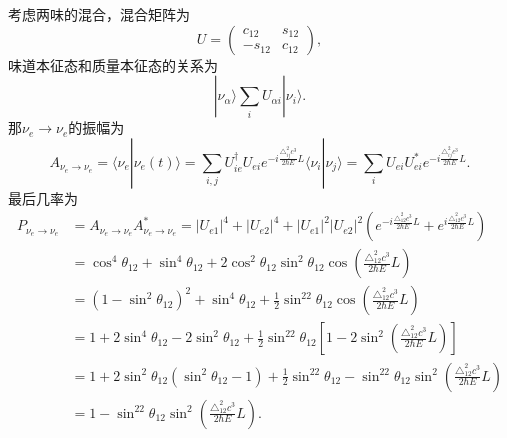 			\begin{GCBox}[title = 二味混合]
				考虑两味的混合，混合矩阵为
					\begin{equation}
						U
						=\left(\begin{matrix}
							c_{12} & s_{12}\\
							-s_{12} & c_{12}
						\end{matrix}\right),
					\end{equation}
				味道本征态和质量本征态的关系为
					\begin{equation}
						|\nu_\alpha\rangle
						\sum_i U_{\alpha i}|\nu_i\rangle.
					\end{equation}
				那$\nu_e\rightarrow\nu_e$的振幅为
					\begin{equation}
						A_{\nu_e \rightarrow \nu_e}
						= \langle \nu_e|\nu_e(t)\rangle
						= \sum_{i,j} U^\dag_{ie}U_{ei}e^{-i\frac{\triangle^2_{ij}c^3}{2\hbar E}L}\langle \nu_i|\nu_j\rangle
						= \sum_i U_{ei}U^*_{ei}e^{-i\frac{\triangle_{ij}^2c^3}{2\hbar E}L}.
					\end{equation}
				最后几率为
					\begin{equation}
						\begin{aligned}
							P_{\nu_e \rightarrow \nu_e}
							&= A_{\nu_e \rightarrow \nu_e}A^*_{\nu_e \rightarrow \nu_e}
							= |U_{e1}|^4 + |U_{e2}|^4 + |U_{e1}|^2|U_{e2}|^2\left(e^{-i\frac{\triangle_{12}^2c^3}{2\hbar E}L} + e^{i\frac{\triangle_{12}^2c^3}{2\hbar E}L}\right)\\
							&= \cos^4\theta_{12} + \sin^4\theta_{12} + 2\cos^2\theta_{12}\sin^2\theta_{12}\cos\left(\frac{\triangle_{12}^2c^3}{2\hbar E}L\right)\\
							&= (1 - \sin^2\theta_{12})^2 + \sin^4\theta_{12} + \frac{1}{2}\sin^22\theta_{12}\cos\left(\frac{\triangle_{12}^2c^3}{2\hbar E}L\right)\\
							&= 1 + 2\sin^4\theta_{12} - 2\sin^2\theta_{12} + \frac{1}{2}\sin^22\theta_{12} \left[1 - 2\sin^2\left(\frac{\triangle_{12}^2c^3}{2\hbar E}L\right)\right]\\
							&= 1 + 2\sin^2\theta_{12}\left(\sin^2\theta_{12} - 1\right) + \frac{1}{2}\sin^22\theta_{12} - \sin^22\theta_{12}\sin^2\left(\frac{\triangle_{12}^2c^3}{2\hbar E}L\right)\\
							&= 1 - \sin^22\theta_{12}\sin^2\left(\frac{\triangle_{12}^2c^3}{2\hbar E}L\right).
						\end{aligned}
					\end{equation}
			\end{GCBox}
